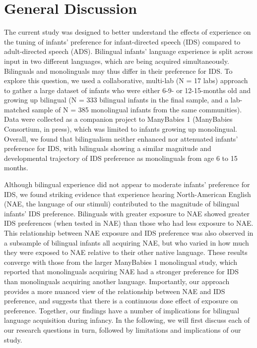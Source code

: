 \documentclass[,man,floatsintext]{apa6}
\begin{document}
\hypertarget{general-discussion}{%
\section{General Discussion}\label{general-discussion}}

The current study was designed to better understand the effects of experience on the tuning of infants' preference for infant-directed speech (IDS) compared to adult-directed speech (ADS). Bilingual infants' language experience is split across input in two different languages, which are being acquired simultaneously. Bilinguals and monolinguals may thus differ in their preference for IDS. To explore this question, we used a collaborative, multi-lab (N = 17 labs) approach to gather a large dataset of infants who were either 6-9- or 12-15-months old and growing up bilingual (N = 333 bilingual infants in the final sample, and a lab-matched sample of N = 385 monolingual infants from the same communities). Data were collected as a companion project to ManyBabies 1 (ManyBabies Consortium, in press), which was limited to infants growing up monolingual. Overall, we found that bilingualism neither enhanced nor attenuated infants' preference for IDS, with bilinguals showing a similar magnitude and developmental trajectory of IDS preference as monolinguals from age 6 to 15 months.

Although bilingual experience did not appear to moderate infants' preference for IDS, we found striking evidence that experience hearing North-American English (NAE, the language of our stimuli) contributed to the magnitude of bilingual infants' IDS preference. Bilinguals with greater exposure to NAE showed greater IDS preferences (when tested in NAE) than those who had less exposure to NAE. This relationship between NAE exposure and IDS preference was also observed in a subsample of bilingual infants all acquiring NAE, but who varied in how much they were exposed to NAE relative to their other native language. These results converge with those from the larger ManyBabies 1 monolingual study, which reported that monolinguals acquiring NAE had a stronger preference for IDS than monolinguals acquiring another language. Importantly, our approach provides a more nuanced view of the relationship between NAE and IDS preference, and suggests that there is a continuous dose effect of exposure on preference. Together, our findings have a number of implications for bilingual language acquisition during infancy. In the following, we will first discuss each of our research questions in turn, followed by limitations and implications of our study.
\end{document}

